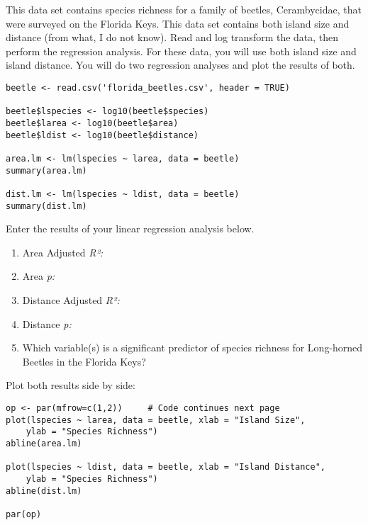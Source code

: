 \documentclass[11pt]{article}
\begin{document}
This data set contains species richness for a family of beetles, Cerambycidae, that were surveyed on the Florida Keys. This data set contains both island size and distance (from what, I do not know).  Read and log transform the data, then perform the regression analysis.  For these data, you will use both island size and island distance.  You will do two regression analyses and plot the results of both.

\begin{verbatim}
beetle <- read.csv('florida_beetles.csv', header = TRUE)

beetle$lspecies <- log10(beetle$species)
beetle$larea <- log10(beetle$area)
beetle$ldist <- log10(beetle$distance)

area.lm <- lm(lspecies ~ larea, data = beetle)
summary(area.lm)

dist.lm <- lm(lspecies ~ ldist, data = beetle)
summary(dist.lm)
\end{verbatim}

Enter the results of your linear regression analysis below.

\begin{enumerate}
	\item  Area Adjusted \textit{R²:} 
	
	\item Area \textit{p:}

	\item  Distance Adjusted \textit{R²:} 
	
	\item Distance \textit{p:}
	
	\item Which variable(s) is a significant predictor of species richness for Long-horned Beetles in the Florida Keys?
\end{enumerate}

\vspace{4\baselineskip}

\newpage

Plot both results side by side:

\begin{verbatim}
op <- par(mfrow=c(1,2))     # Code continues next page
plot(lspecies ~ larea, data = beetle, xlab = "Island Size",
    ylab = "Species Richness")
abline(area.lm)

plot(lspecies ~ ldist, data = beetle, xlab = "Island Distance",
    ylab = "Species Richness")
abline(dist.lm)

par(op)
\end{verbatim}
\end{document}
